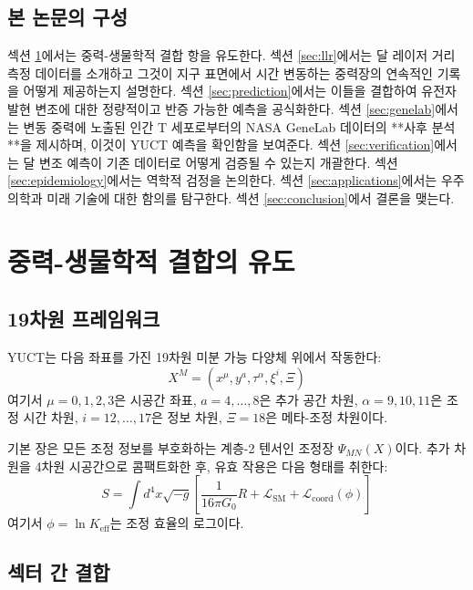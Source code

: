 \documentclass[12pt,a4paper]{article}
\theoremstyle{remark}
\newcommand{\Keff}{K_{\mathrm{eff}}}
\begin{document}
	\subsection{본 논문의 구성}
	
	섹션 \ref{sec:derivation}에서는 중력-생물학적 결합 항을 유도한다. 섹션 \ref{sec:llr}에서는 달 레이저 거리 측정 데이터를 소개하고 그것이 지구 표면에서 시간 변동하는 중력장의 연속적인 기록을 어떻게 제공하는지 설명한다. 섹션 \ref{sec:prediction}에서는 이들을 결합하여 유전자 발현 변조에 대한 정량적이고 반증 가능한 예측을 공식화한다. 섹션 \ref{sec:genelab}에서는 변동 중력에 노출된 인간 T 세포로부터의 NASA GeneLab 데이터의 **사후 분석**을 제시하며, 이것이 YUCT 예측을 확인함을 보여준다. 섹션 \ref{sec:verification}에서는 달 변조 예측이 기존 데이터로 어떻게 검증될 수 있는지 개괄한다. 섹션 \ref{sec:epidemiology}에서는 역학적 검정을 논의한다. 섹션 \ref{sec:applications}에서는 우주 의학과 미래 기술에 대한 함의를 탐구한다. 섹션 \ref{sec:conclusion}에서 결론을 맺는다.
	
	\section{중력-생물학적 결합의 유도}
	\label{sec:derivation}
	
	\subsection{19차원 프레임워크}
	
	YUCT는 다음 좌표를 가진 19차원 미분 가능 다양체 위에서 작동한다:
	\[
	X^M = (x^\mu, y^a, \tau^\alpha, \xi^i, \Xi)
	\]
	여기서 \(\mu = 0,1,2,3\)은 시공간 좌표, \(a = 4,\dots,8\)은 추가 공간 차원, \(\alpha = 9,10,11\)은 조정 시간 차원, \(i = 12,\dots,17\)은 정보 차원, \(\Xi = 18\)은 메타-조정 차원이다.
	
	기본 장은 모든 조정 정보를 부호화하는 계층-2 텐서인 조정장 \(\Psi_{MN}(X)\)이다. 추가 차원을 4차원 시공간으로 콤팩트화한 후, 유효 작용은 다음 형태를 취한다:
	\begin{equation}
		S = \int d^4x \sqrt{-g} \left[ \frac{1}{16\pi G_0} R + \mathcal{L}_{\text{SM}} + \mathcal{L}_{\text{coord}}(\phi) \right]
		\label{eq:action}
	\end{equation}
	여기서 \(\phi = \ln \Keff\)는 조정 효율의 로그이다.
	
	\subsection{섹터 간 결합}
	
\end{document}
